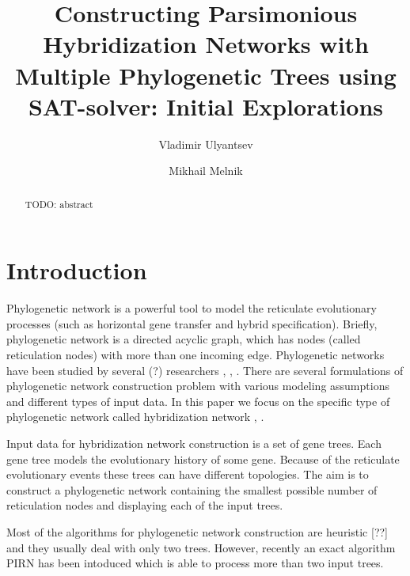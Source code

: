 \documentclass[runningheads, envcountsame, a4paper]{llncs}
\begin{document}
\mainmatter           
\title{Constructing Parsimonious Hybridization Networks with Multiple Phylogenetic Trees using SAT-solver: Initial Explorations}
\titlerunning{ } 
\toctitle{ }

\author{Vladimir Ulyantsev \and Mikhail Melnik}

\maketitle
\setcounter{footnote}{0}

\begin{abstract}
  TODO: abstract

\end{abstract}

\section{Introduction}

Phylogenetic network is a powerful tool to model the reticulate
evolutionary processes (such as horizontal gene transfer and hybrid specification).
Briefly, phylogenetic network is a directed acyclic graph, which has
nodes (called reticulation nodes) with more than one incoming edge. Phylogenetic
networks have been studied by several (?) researchers \cite{huson2010phylogenetic}, \cite{morrison2011introduction}, 
\cite{nakhleh2011evolutionary}. There are several formulations of phylogenetic network
construction problem with various modeling assumptions and different types of input data. 
In this paper we focus on the specific type of phylogenetic network called hybridization
network \cite{semple2006hybridization}, \cite{chen2010hybridnet}.

Input data for hybridization network construction is a set of gene trees. %
Each gene tree models the evolutionary history of some gene. %
Because of the reticulate evolutionary events these trees can have different topologies.
The aim is to construct a phylogenetic network
containing the smallest possible number of reticulation nodes and displaying each of the input trees. 

Most of the algorithms for phylogenetic network construction are heuristic [??] and they usually deal with only two trees.
However, recently an exact algorithm PIRN has been intoduced \cite{wu2013algorithm} which is able to process more than two input trees.
\end{document}
